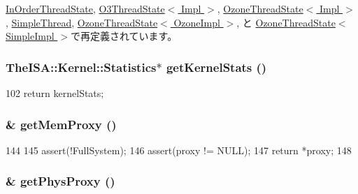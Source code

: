 \hyperlink{classInOrderThreadState_a13fa12d1779a94a1e0b968946a1367c7}{InOrderThreadState}, \hyperlink{structO3ThreadState_a13fa12d1779a94a1e0b968946a1367c7}{O3ThreadState$<$ Impl $>$}, \hyperlink{structOzoneThreadState_a13fa12d1779a94a1e0b968946a1367c7}{OzoneThreadState$<$ Impl $>$}, \hyperlink{classSimpleThread_a13fa12d1779a94a1e0b968946a1367c7}{SimpleThread}, \hyperlink{structOzoneThreadState_a13fa12d1779a94a1e0b968946a1367c7}{OzoneThreadState$<$ OzoneImpl $>$}, と \hyperlink{structOzoneThreadState_a13fa12d1779a94a1e0b968946a1367c7}{OzoneThreadState$<$ SimpleImpl $>$}で再定義されています。\hypertarget{structThreadState_a3faa5e314c06241296ab582bb891a06a}{
\subsubsection[{getKernelStats}]{\setlength{\rightskip}{0pt plus 5cm}TheISA::Kernel::Statistics$\ast$ getKernelStats ()}}
\label{structThreadState_a3faa5e314c06241296ab582bb891a06a}



\begin{DoxyCode}
102 { return kernelStats; }
\end{DoxyCode}
\hypertarget{structThreadState_a5022ffa44e87701f51893d78c0def3a5}{
\subsubsection[{getMemProxy}]{ \& getMemProxy ()}}
\label{structThreadState_a5022ffa44e87701f51893d78c0def3a5}



\begin{DoxyCode}
144 {
145     assert(!FullSystem);
146     assert(proxy != NULL);
147     return *proxy;
148 }
\end{DoxyCode}
\hypertarget{structThreadState_a2506d37aed5696e386e4d39270b53556}{
\subsubsection[{getPhysProxy}]{ \& getPhysProxy ()}}
\label{structThreadState_a2506d37aed5696e386e4d39270b53556}



